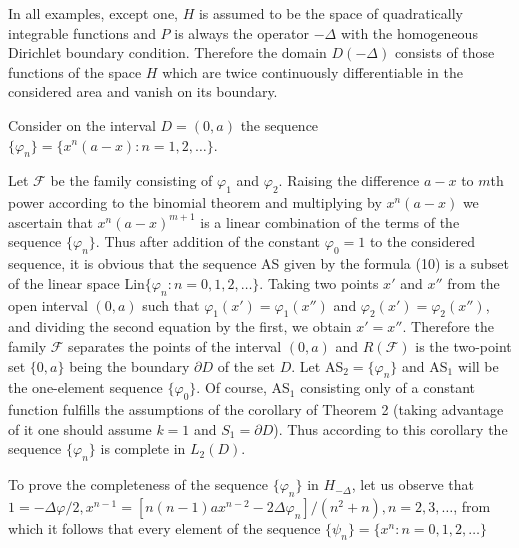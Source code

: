 \documentclass{article}
\newcommand{\tmrsub}[1]{\ensuremath{_{\textrm{#1}}}}
\begin{document}
In all examples, except one, $H$ is assumed to be the space of quadratically
integrable functions and $P$ is always the operator $- \Delta$ with the
homogeneous Dirichlet boundary condition. Therefore the domain $D (- \Delta)$
consists of those functions of the space $H$ which are twice continuously
differentiable in the considered area and vanish on its boundary.

\begin{example}
  Consider on the interval $D = (0, a)$ the sequence $\{\varphi_n \} = \{x^n
  (a - x) : n = 1, 2, \ldots\}$.
  
  Let $\mathcal{F}$ be the family consisting of $\varphi_1$ and $\varphi_2$.
  Raising the difference $a - x$ to $m$th power according to the binomial
  theorem and multiplying by $x^n  (a - x)$ we ascertain that $x^n  (a - x)^{m
  + 1}$ is a linear combination of the terms of the sequence $\{\varphi_n \}$.
  Thus after addition of the constant $\varphi_0 = 1$ to the considered
  sequence, it is obvious that the sequence AS given by the formula (10) is a
  subset of the linear space Lin$\{\varphi_n : n = 0, 1, 2, \ldots\}$. Taking
  two points $x'$ and $x''$ from the open interval $(0, a)$ such that
  $\varphi_1 (x') = \varphi_1 (x'')$ and $\varphi_2 (x') = \varphi_2 (x'')$,
  and dividing the second equation by the first, we obtain $x' = x''$.
  Therefore the family $\mathcal{F}$ separates the points of the interval $(0,
  a)$ and $R (\mathcal{F})$ is the two-point set $\{0, a\}$ being the boundary
  $\partial D$ of the set $D$. Let AS$_2 = \{\varphi_n \}$ and AS\tmrsub{$1$}
  will be the one-element sequence $\{\varphi_0 \}$. Of course, AS\tmrsub{$1$}
  consisting only of a constant function fulfills the assumptions of the
  corollary of Theorem 2 (taking advantage of it one should assume $k = 1$ and
  $S_1 = \partial D$). Thus according to this corollary the sequence
  $\{\varphi_n \}$ is complete in $L_2 (D)$.
  
  To prove the completeness of the sequence $\{\varphi_n \}$ in $H_{-
  \Delta}$, let us observe that $1 = - \Delta \varphi / 2, x^{n - 1} = [n (n -
  1) ax^{n - 2} - 2 \Delta \varphi_n] / (n^2 + n), n = 2, 3, \ldots$, from
  which it follows that every element of the sequence $\{\psi_n \} = \{x^n : n
  = 0, 1, 2, \ldots\}$
\end{example}
\end{document}
